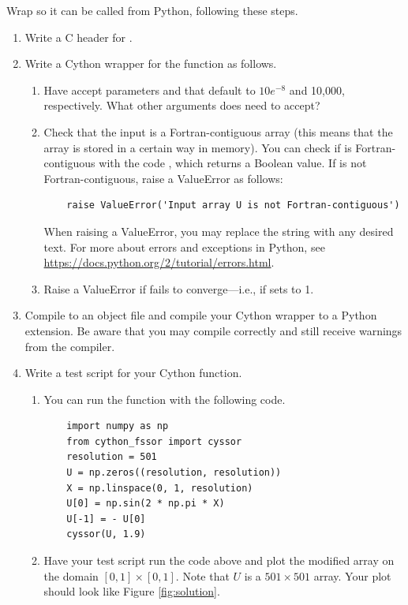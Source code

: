 \begin{problem}\label{prob:c_wrap}
Wrap  so it can be called from Python, following these steps.
\begin{enumerate}
\item Write a C header for .
\item Write a Cython wrapper  for the function  as follows.
    \begin{enumerate}
    \item Have  accept parameters  and  that default to $10e^{-8}$ and 10,000, respectively.
    What other arguments does  need to accept?
    \item Check that the input  is a Fortran-contiguous array (this means that the array is stored in a certain way in memory).
    You can check if  is Fortran-contiguous with the code , which returns a Boolean value.
    If  is not Fortran-contiguous, raise a ValueError as follows:
    \begin{lstlisting}
    raise ValueError('Input array U is not Fortran-contiguous')
    \end{lstlisting}
    When raising a ValueError, you may replace the string  with any desired text.
    For more about errors and exceptions in Python, see \url{https://docs.python.org/2/tutorial/errors.html}.
    \item Raise a ValueError if  fails to converge---i.e., if  sets  to 1.
    \end{enumerate}
\item Compile  to an object file and compile your Cython wrapper to a Python extension. 
Be aware that you may compile  correctly and still receive warnings from the compiler.
\item Write a test script for your Cython function.
    \begin{enumerate}
    \item You can run the function with the following code.
    \begin{lstlisting}
	import numpy as np
	from cython_fssor import cyssor
	resolution = 501
	U = np.zeros((resolution, resolution))
	X = np.linspace(0, 1, resolution)
	U[0] = np.sin(2 * np.pi * X)
	U[-1] = - U[0]
	cyssor(U, 1.9)
	\end{lstlisting}
    \item Have your test script run the code above and plot the modified array  on the domain $[0,1]\times[0, 1]$. 
    Note that $U$ is a $501\times 501$ array.
    Your plot should look like Figure \ref{fig:solution}.
    \end{enumerate}
\end{enumerate}


\end{problem}
